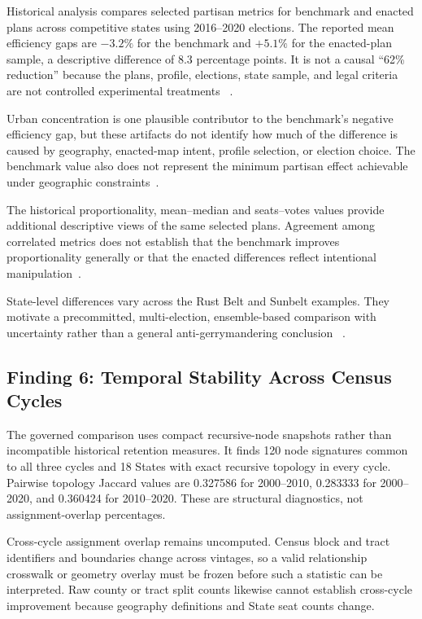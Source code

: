Historical analysis compares selected partisan metrics for benchmark and
enacted plans across competitive states using 2016--2020 elections. The
reported mean efficiency gaps are $-3.2\%$ for the benchmark and $+5.1\%$ for
the enacted-plan sample, a descriptive difference of 8.3 percentage points.
It is not a causal ``62\% reduction'' because the plans, profile, elections,
state sample, and legal criteria are not controlled experimental treatments
~\cite{stephanopoulos2015partisan,deluca2026efficiency}.

Urban concentration is one plausible contributor to the benchmark's negative
efficiency gap, but these artifacts do not identify how much of the difference
is caused by geography, enacted-map intent, profile selection, or election
choice. The benchmark value also does not represent the minimum partisan effect
achievable under geographic constraints~\cite{chen2013unintentional}.

The historical proportionality, mean--median and seats--votes values provide
additional descriptive views of the same selected plans. Agreement among
correlated metrics does not establish that the benchmark improves
proportionality generally or that the enacted differences reflect intentional
manipulation~\cite{deluca2026efficiency}.

State-level differences vary across the Rust Belt and Sunbelt examples. They
motivate a precommitted, multi-election, ensemble-based comparison with
uncertainty rather than a general anti-gerrymandering conclusion
~\cite{rodden2019cities,deluca2026edgeweighted}.

\subsection{Finding 6: Temporal Stability Across Census Cycles}

The governed comparison uses compact recursive-node snapshots rather than
incompatible historical retention measures. It finds 120 node signatures
common to all three cycles and 18 States with exact recursive topology in every
cycle. Pairwise topology Jaccard values are 0.327586 for 2000--2010, 0.283333
for 2000--2020, and 0.360424 for 2010--2020. These are structural diagnostics,
not assignment-overlap percentages.

Cross-cycle assignment overlap remains uncomputed. Census block and tract
identifiers and boundaries change across vintages, so a valid relationship
crosswalk or geometry overlay must be frozen before such a statistic can be
interpreted. Raw county or tract split counts likewise cannot establish
cross-cycle improvement because geography definitions and State seat counts
change.
